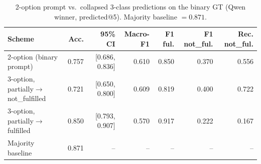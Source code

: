 \begin{table}[htbp]
  \centering
  \caption{2-option prompt vs.\ collapsed 3-class predictions on the binary GT (Qwen winner, predicted@5). Majority baseline $=0.871$.}
  \label{tab:binary-vs-ternary}
  \begin{tabular}{lrrrrrr}
    \toprule
    Scheme & Acc. & 95\% CI & Macro-F1 & F1 ful. & F1 not\_ful. & Rec. not\_ful. \\
    \midrule
    2-option (binary prompt) & 0.757 & [0.686, 0.836] & 0.610 & 0.850 & 0.370 & 0.556 \\
    3-option, partially$\to$not\_fulfilled & 0.721 & [0.650, 0.800] & 0.609 & 0.819 & 0.400 & 0.722 \\
    3-option, partially$\to$fulfilled & 0.850 & [0.793, 0.907] & 0.570 & 0.917 & 0.222 & 0.167 \\
    Majority baseline & 0.871 & -- & -- & -- & -- & -- \\
    \bottomrule
  \end{tabular}
\end{table}
